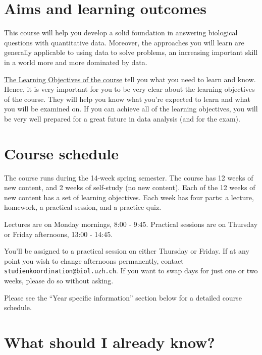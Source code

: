 \documentclass[
  letterpaper,
  8pt,
  a4paper]{book}
\begin{document}
\section*{Aims and learning outcomes}\label{aims-and-learning-outcomes}


This course will help you develop a solid foundation in answering
biological questions with quantitative data. Moreover, the approaches
you will learn are generally applicable to using data to solve problems,
an increasing important skill in a world more and more dominated by
data.

\href{https://opetchey.github.io/BIO144_Course_Information/3.1-learning-objectives.html}{The
Learning Objectives of the course} tell you what you need to learn and
know. Hence, it is very important for you to be very clear about the
learning objectives of the course. They will help you know what you're
expected to learn and what you will be examined on. If you can achieve
all of the learning objectives, you will be very well prepared for a
great future in data analysis (and for the exam).

\section*{Course schedule}\label{course-schedule}


The course runs during the 14-week spring semester. The course has 12
weeks of new content, and 2 weeks of self-study (no new content). Each
of the 12 weeks of new content has a set of learning objectives. Each
week has four parts: a lecture, homework, a practical session, and a
practice quiz.

Lectures are on Monday mornings, 8:00 - 9:45. Practical sessions are on
Thursday or Friday afternoons, 13:00 - 14:45.

You'll be assigned to a practical session on either Thursday or Friday.
If at any point you wish to change afternoons permanently, contact
\texttt{studienkoordination@biol.uzh.ch}. If you want to swap days for
just one or two weeks, please do so without asking.

Please see the ``Year specific information'' section below for a
detailed course schedule.

\section*{What should I already know?}\label{what-should-i-already-know}
\end{document}
